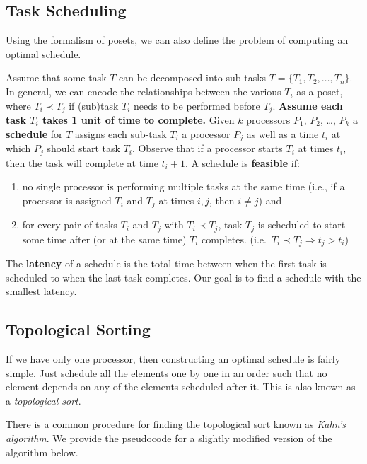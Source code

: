 \documentclass{article}
\begin{document}
    \subsection*{Task Scheduling}
    
    Using the formalism of posets, we can also define the problem of computing an optimal schedule.

    \vspace{3mm} Assume that some task $T$ can be decomposed into sub-tasks $T = \{T_{1}, T_{2}, \dots, T_{n}\}$. In general, we can encode the relationships between the various $T_{i}$ as a poset, where $T_{i} \prec T_{j}$ if (sub)task $T_{i}$ needs to be performed before $T_{j}$. \textbf{Assume each task $T_{i}$ takes 1 unit of time to complete.} Given $k$ processors $P_{1}$, $P_{2}$, \dots, $P_{k}$ a \textbf{schedule} for $T$ assigns each sub-task $T_{i}$ a processor $P_{j}$ as well as a time $t_{i}$ at which $P_{j}$ should start task $T_{i}$. Observe that if a processor starts $T_{i}$ at times $t_{i}$, then the task will complete at time $t_{i} + 1$. A schedule is \textbf{feasible} if:
    \begin{enumerate}[label = \arabic*]
        \item no single processor is performing multiple tasks at the same time (i.e., if a processor is assigned $T_{i}$ and $T_{j}$ at times $i, j$, then $i \ne j$) and
        \item for every pair of tasks $T_{i}$ and $T_{j}$ with $T_{i} \prec T_{j}$, task $T_{j}$ is scheduled to start some time after (or at the same time) $T_{i}$ completes. (i.e.\ $T_{i} \prec T_{j} \Rightarrow t_{j} > t_{i}$)
    \end{enumerate}
    The \textbf{latency} of a schedule is the total time between when the first task is scheduled to when the last task completes. Our goal is to find a schedule with the smallest latency.

    \subsection*{Topological Sorting}
    If we have only one processor, then constructing an optimal schedule is fairly simple. Just schedule all the elements one by one in an order such that no element depends on any of the elements scheduled after it. This is also known as a \textit{topological sort}.

    \vspace{3mm}
    There is a common procedure for finding the topological sort known as \textit{Kahn's algorithm}. We provide the pseudocode for a slightly modified version of the algorithm below.
\end{document}
